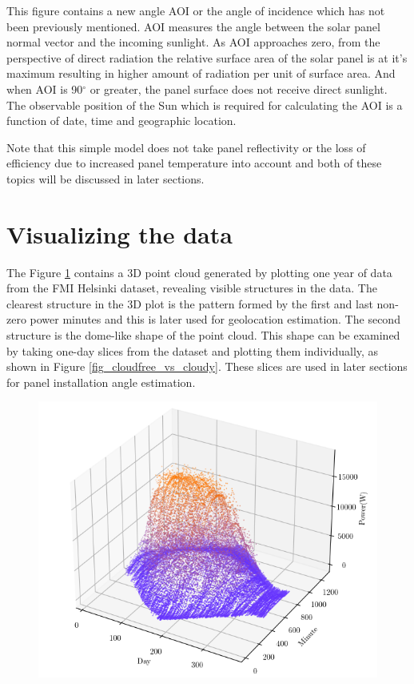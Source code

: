 This figure contains a new angle AOI or the angle of incidence which has not been previously mentioned. AOI measures the angle between the solar panel normal vector and the incoming sunlight. As AOI approaches zero, from the perspective of direct radiation the relative surface area of the solar panel is at it's maximum resulting in higher amount of radiation per unit of surface area. And when AOI is 90$^\circ$ or greater, the panel surface does not receive direct sunlight. The observable position of the Sun which is required for calculating the AOI is a function of date, time and geographic location.

Note that this simple model does not take panel reflectivity or the loss of efficiency due to increased panel temperature into account and both of these topics will be discussed in later sections.



\section{Visualizing the data}
The Figure \ref{fig_oneyear_pointcloud} contains a 3D point cloud generated by plotting one year of data from the FMI Helsinki dataset, revealing visible structures in the data. The clearest structure in the 3D plot is the pattern formed by the first and last non-zero power minutes and this is later used for geolocation estimation. The second structure is the dome-like shape of the point cloud. This shape can be examined by taking one-day slices from the dataset and plotting them individually, as shown in Figure  \ref{fig_cloudfree_vs_cloudy}. These slices are used in later sections for panel installation angle estimation.

\begin{figure}[h]
\centering
\includegraphics[width=0.8\linewidth]{pics/oneyear2}
\label{fig_oneyear_pointcloud}
\end{figure}

